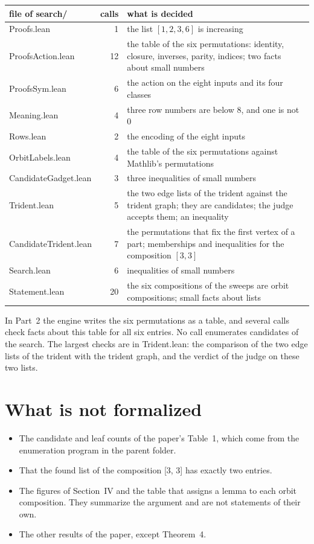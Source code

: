 \documentclass[11pt,a4paper]{article}
\newcommand{\leanus}{\textunderscore\allowbreak}
\newcommand{\lean}[1]{{\ttfamily\let\_\leanus #1}}
\begin{document}
\begin{center}
\begin{tabular}{@{}lrp{}@{}}
\toprule
file of \lean{search/} & calls & what is decided\\
\midrule
\lean{Proofs.lean} & 1 & the list $[1,2,3,6]$ is increasing\\
\lean{ProofsAction.lean} & 12 & the table of the six permutations: identity, closure, inverses, parity, indices; two facts about small numbers\\
\lean{ProofsSym.lean} & 6 & the action on the eight inputs and its four classes\\
\lean{Meaning.lean} & 4 & three row numbers are below 8, and one is not 0\\
\lean{Rows.lean} & 2 & the encoding of the eight inputs\\
\lean{OrbitLabels.lean} & 4 & the table of the six permutations against Mathlib's permutations\\
\lean{CandidateGadget.lean} & 3 & three inequalities of small numbers\\
\lean{Trident.lean} & 5 & the two edge lists of the trident against the trident graph; they are candidates; the judge accepts them; an inequality\\
\lean{CandidateTrident.lean} & 7 & the permutations that fix the first vertex of a part; memberships and inequalities for the composition $[3,3]$\\
\lean{Search.lean} & 6 & inequalities of small numbers\\
\lean{Statement.lean} & 20 & the six compositions of the sweeps are orbit compositions; small facts about lists\\
\bottomrule
\end{tabular}
\end{center}
In Part~2 the engine writes the six permutations as a table, and several
calls check facts about this table for all six entries. No call enumerates
candidates of the search. The largest checks are in \lean{Trident.lean}:
the comparison of the two edge lists of the trident with the trident graph,
and the verdict of the judge on these two lists.

\section{What is not formalized}\label{sec:gaps}

\begin{itemize}
\item The candidate and leaf counts of the paper's Table~1, which come from
the enumeration program in the parent folder.
\item That the found list of the composition \lean{[3, 3]} has exactly two
entries.
\item The figures of Section~IV and the table that assigns a lemma to each
orbit composition. They summarize the argument and are not statements of
their own.
\item The other results of the paper, except Theorem~4.
\end{itemize}
\end{document}
